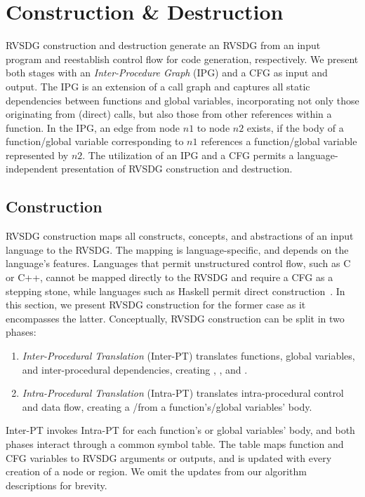 \section{Construction \& Destruction}

RVSDG construction and destruction generate an RVSDG from an input program
and reestablish control flow for code generation, respectively. We present both stages with an
\emph{Inter-Procedure Graph} (IPG) and a CFG as input and output. The IPG is an extension of a
call graph and captures all static dependencies between functions and global variables,
incorporating not only those originating from (direct) calls, but also those from other references
within a function. In the IPG, an edge from node $n1$ to node $n2$ exists, if the body of a
function/global variable corresponding to $n1$ references a function/global variable represented
by $n2$. The utilization of an IPG and a CFG permits a language-independent presentation of RVSDG
construction and destruction.

\subsection{Construction}\label{sec:construction}
RVSDG construction maps all constructs, concepts, and abstractions of an
input language to the RVSDG. The mapping is language-specific, and depends on the language's
features. Languages that permit unstructured control flow, such as C
or C++, cannot be mapped directly to the RVSDG and require a CFG as a stepping
stone, while languages such as Haskell permit direct construction~\cite{Reissmann12}.
In this section, we present RVSDG construction for the former case as it
encompasses the latter.
Conceptually, RVSDG construction can be split in two phases:

\begin{enumerate}
	\item \textit{Inter-Procedural Translation} (Inter-PT) translates functions, global variables,
	and inter-procedural dependencies, creating \lambdam, \deltam, and \phinodes.

	\item \textit{Intra-Procedural Translation} (Intra-PT) translates intra-procedural
		control and data flow, creating a \deltam/\lambdaregion from a function's/global variables'
		body.
\end{enumerate}

Inter-PT invokes Intra-PT for each function's or global variables' body, and both
phases interact through a common symbol table. The table maps function and CFG variables to
RVSDG arguments or outputs, and is updated with every creation of a
node or region. We omit the updates from our algorithm descriptions for brevity.

